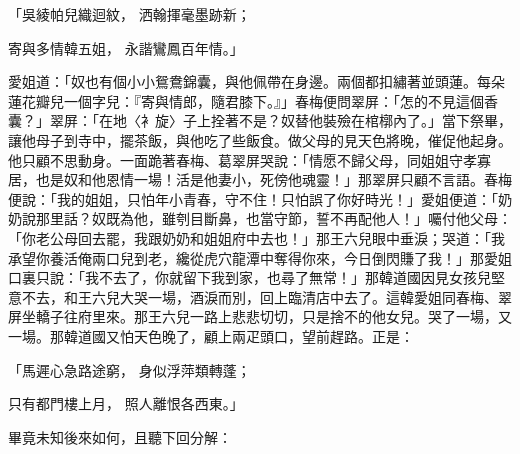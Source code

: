 「吳綾帕兒織迴紋，  洒翰揮毫墨跡新；

寄與多情韓五姐，  永諧鸞鳳百年情。」

愛姐道：「奴也有個小小鴛鴦錦囊，與他佩帶在身邊。兩個都扣繡著並頭蓮。每朵蓮花瓣兒一個字兒：『寄與情郎，隨君膝下。』」春梅便問翠屏：「怎的不見這個香囊？」翠屏：「在地〈衤旋〉子上拴著不是？奴替他裝殮在棺槨內了。」當下祭畢，讓他母子到寺中，擺茶飯，與他吃了些飯食。做父母的見天色將晚，催促他起身。他只顧不思動身。一面跪著春梅、葛翠屏哭說：「情愿不歸父母，同姐姐守孝寡居，也是奴和他恩情一場！活是他妻小，死傍他魂靈！」那翠屏只顧不言語。春梅便說：「我的姐姐，只怕年小青春，守不住！只怕誤了你好時光！」愛姐便道：「奶奶說那里話？奴既為他，雖刳目斷鼻，也當守節，誓不再配他人！」囑付他父母：「你老公母回去罷，我跟奶奶和姐姐府中去也！」那王六兒眼中垂淚；哭道：「我承望你養活俺兩口兒到老，纔從虎穴龍潭中奪得你來，今日倒閃賺了我！」那愛姐口裏只說：「我不去了，你就留下我到家，也尋了無常！」那韓道國因見女孩兒堅意不去，和王六兒大哭一場，酒淚而別，回上臨清店中去了。這韓愛姐同春梅、翠屏坐轎子往府里來。那王六兒一路上悲悲切切，只是捨不的他女兒。哭了一場，又一場。那韓道國又怕天色晚了，顧上兩疋頭口，望前趕路。正是：

「馬遲心急路途窮，  身似浮萍類轉蓬；

只有都門樓上月，  照人離恨各西東。」

畢竟未知後來如何，且聽下回分解：

